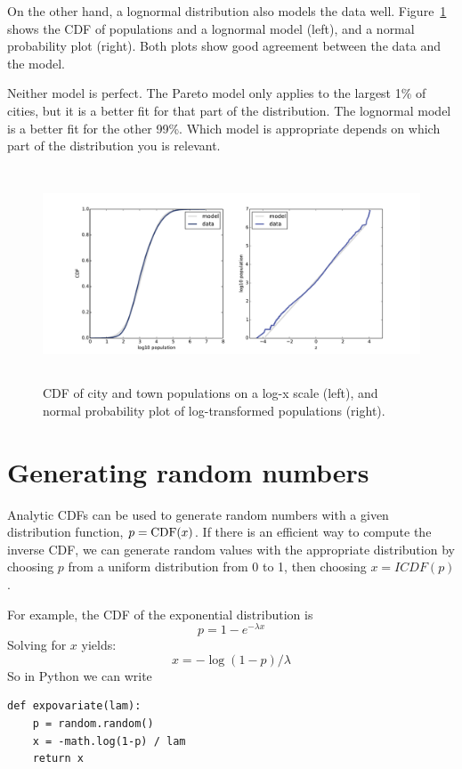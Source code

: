 \documentclass[12pt]{book}
\begin{document}
On the other hand, a lognormal distribution also models the data well.
Figure~\ref{populations_normal} shows the CDF of populations and a
lognormal model (left), and a normal probability plot (right).  Both
plots show good agreement between the data and the model.

Neither model is perfect.
The Pareto model only applies to the largest 1\% of cities, but it
is a better fit for that part of the distribution.  The lognormal
model is a better fit for the other 99\%.
Which model is appropriate depends on which part of the distribution
you is relevant.

\begin{figure}
\centerline{\includegraphics[height=2.5in]{figs/populations_normal.pdf}}
\caption{CDF of city and town populations on a log-x scale (left), and
normal probability plot of log-transformed populations (right).}
\label{populations_normal}
\end{figure}


\section{Generating random numbers}

Analytic CDFs can be used to generate random numbers with a given
distribution function, $p = \mathrm{CDF}(x)$.  If there is an efficient way to
compute the inverse CDF, we can generate random values
with the appropriate distribution by choosing $p$ from a uniform
distribution from 0 to 1, then choosing
$x = ICDF(p)$.

For example, the CDF of the exponential distribution is
%
\[ p = 1 - e^{-\lambda x} \]
%
Solving for $x$ yields:
%
\[ x = -\log (1 - p) / \lambda \]
%
So in Python we can write
%
\begin{verbatim}
def expovariate(lam):
    p = random.random()
    x = -math.log(1-p) / lam
    return x
\end{verbatim}
\end{document}
